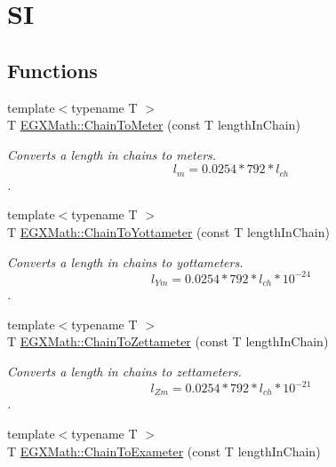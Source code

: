 \hypertarget{group___e_g_x_math-_conversions-_length_conversions-_surveyors-_chain-_s_i}{}\section{SI}
\label{group___e_g_x_math-_conversions-_length_conversions-_surveyors-_chain-_s_i}
\subsection*{Functions}
\begin{DoxyCompactItemize}
\item 
{\footnotesize template$<$typename T $>$ }\\T \mbox{\hyperlink{group___e_g_x_math-_conversions-_length_conversions-_surveyors-_chain-_s_i_ga94f1a1b0e10796717226224d825e0490}{E\+G\+X\+Math\+::\+Chain\+To\+Meter}} (const T length\+In\+Chain)
\begin{DoxyCompactList}\small\item\em Converts a length in chains to meters. \[ l_{m}=0.0254 * 792 * l_{ch} \]. \end{DoxyCompactList}\item 
{\footnotesize template$<$typename T $>$ }\\T \mbox{\hyperlink{group___e_g_x_math-_conversions-_length_conversions-_surveyors-_chain-_s_i_ga033ed288c43416b74a897a3902cc49b2}{E\+G\+X\+Math\+::\+Chain\+To\+Yottameter}} (const T length\+In\+Chain)
\begin{DoxyCompactList}\small\item\em Converts a length in chains to yottameters. \[ l_{Ym}=0.0254 * 792 * l_{ch} * 10^{-24} \]. \end{DoxyCompactList}\item 
{\footnotesize template$<$typename T $>$ }\\T \mbox{\hyperlink{group___e_g_x_math-_conversions-_length_conversions-_surveyors-_chain-_s_i_ga8fe1fdac139b7f842766aedd772527eb}{E\+G\+X\+Math\+::\+Chain\+To\+Zettameter}} (const T length\+In\+Chain)
\begin{DoxyCompactList}\small\item\em Converts a length in chains to zettameters. \[ l_{Zm}=0.0254 * 792 * l_{ch} * 10^{-21} \]. \end{DoxyCompactList}\item 
{\footnotesize template$<$typename T $>$ }\\T \mbox{\hyperlink{group___e_g_x_math-_conversions-_length_conversions-_surveyors-_chain-_s_i_ga82f07f687e804faabd25839c5066792a}{E\+G\+X\+Math\+::\+Chain\+To\+Exameter}} (const T length\+In\+Chain)

\end{DoxyCompactItemize}
